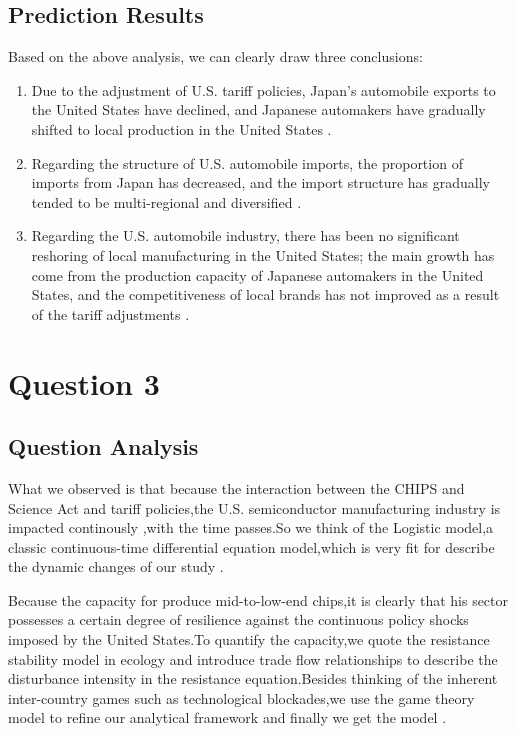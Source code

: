 \documentclass{apmcmthesis}
\begin{document}
\subsection{Prediction Results}
Based on the above analysis, we can clearly draw three conclusions:
\begin{enumerate}
    \item Due to the adjustment of U.S. tariff policies, Japan's automobile exports to the United States have declined, and Japanese automakers have gradually shifted to local production in the United States \cite{jama2025statistics}.
    \item Regarding the structure of U.S. automobile imports, the proportion of imports from Japan has decreased, and the import structure has gradually tended to be multi-regional and diversified \cite{bea2025trade}.
    \item Regarding the U.S. automobile industry, there has been no significant reshoring of local manufacturing in the United States; the main growth has come from the production capacity of Japanese automakers in the United States, and the competitiveness of local brands has not improved as a result of the tariff adjustments \cite{piie2025tariff}.
\end{enumerate}


\section{Question 3}

\subsection{Question Analysis}
What we observed is that because the interaction between the CHIPS and Science Act and  tariff policies,the U.S. semiconductor manufacturing industry is impacted continously ,with the time passes.So we think of the Logistic model,a classic continuous-time differential equation model,which is very fit for describe the dynamic changes of our study \cite{nist2025chips}.

Because the capacity for produce mid-to-low-end chips,it is clearly that his sector possesses a certain degree of resilience against the continuous policy shocks imposed by the United States.To quantify the capacity,we quote the resistance stability model in ecology and introduce trade flow relationships to describe the disturbance intensity in the resistance equation.Besides thinking of the inherent inter-country games such as technological blockades,we use the game theory model to refine our analytical framework and finally we get the model \cite{semiconductors2025state}.
\end{document}
